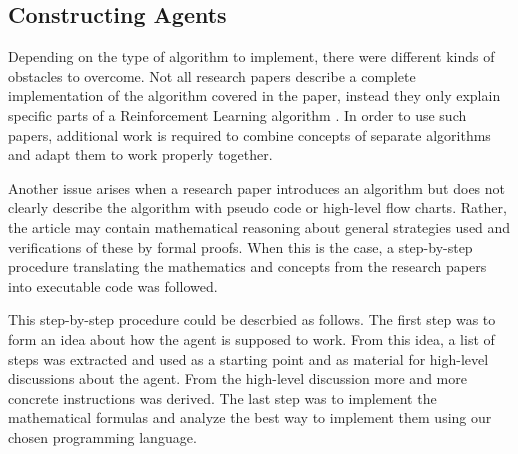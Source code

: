 \subsection{Constructing Agents }
\label{sec:trans_math_intruc}
Depending on the type of algorithm to implement, there were different kinds of obstacles to overcome. Not all research papers describe a complete implementation of the algorithm covered in the paper, instead they only explain specific parts of a Reinforcement Learning algorithm \parencite{kearns2002near}. In order to use such papers, additional work is required to combine concepts of separate algorithms and adapt them to work properly together.

Another issue arises when a  research paper introduces an algorithm but does not clearly describe the algorithm with pseudo code or high-level flow charts. Rather, the article may contain mathematical reasoning about general strategies used and verifications of these by formal proofs. When this is the case, a step-by-step procedure translating the mathematics and concepts from the research papers into executable code was followed.  

This step-by-step procedure could be descrbied as follows. The first step was to form an idea about how the agent is supposed to work. From this idea, a list of steps was extracted and used as a starting point and as material for high-level discussions about the agent. From the high-level discussion more and more concrete instructions was derived. The last step was to implement the mathematical formulas and analyze the best way to implement them using our chosen programming language. 